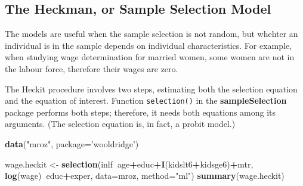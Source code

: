 \documentclass[]{book}
\newenvironment{Shaded}{\begin{snugshade}}{\end{snugshade}}
\newcommand{\DataTypeTok}[1]{\textcolor[rgb]{0.13,0.29,0.53}{#1}}
\newcommand{\KeywordTok}[1]{\textcolor[rgb]{0.13,0.29,0.53}{\textbf{#1}}}
\newcommand{\NormalTok}[1]{#1}
\newcommand{\OperatorTok}[1]{\textcolor[rgb]{0.81,0.36,0.00}{\textbf{#1}}}
\newcommand{\StringTok}[1]{\textcolor[rgb]{0.31,0.60,0.02}{#1}}
\begin{document}
\hypertarget{the-heckman-or-sample-selection-model}{%
\subsection{The Heckman, or Sample Selection
Model}\label{the-heckman-or-sample-selection-model}}

The models are useful when the sample selection is not random, but
whehter an individual is in the sample depends on individual
characteristics. For example, when studying wage determination for
married women, some women are not in the labour force, therefore their
wages are zero.

The Heckit procedure involves two steps, estimating both the selection
equation and the equation of interest. Function \texttt{selection()} in
the \textbf{sampleSelection} package performs both steps; therefore, it
needs both equations among its arguments. (The selection equation is, in
fact, a probit model.)

\begin{Shaded}
\begin{Highlighting}[]
\KeywordTok{data}\NormalTok{(}\StringTok{"mroz"}\NormalTok{, }\DataTypeTok{package=}\StringTok{'wooldridge'}\NormalTok{)}

\NormalTok{wage.heckit <-}\StringTok{ }\KeywordTok{selection}\NormalTok{(inlf}\OperatorTok{~}\NormalTok{age}\OperatorTok{+}\NormalTok{educ}\OperatorTok{+}\KeywordTok{I}\NormalTok{(kidslt6}\OperatorTok{+}\NormalTok{kidsge6)}\OperatorTok{+}\NormalTok{mtr,}
                         \KeywordTok{log}\NormalTok{(wage)}\OperatorTok{~}\NormalTok{educ}\OperatorTok{+}\NormalTok{exper, }
                         \DataTypeTok{data=}\NormalTok{mroz, }\DataTypeTok{method=}\StringTok{"ml"}\NormalTok{)}
\KeywordTok{summary}\NormalTok{(wage.heckit)}
\end{Highlighting}
\end{Shaded}
\end{document}
